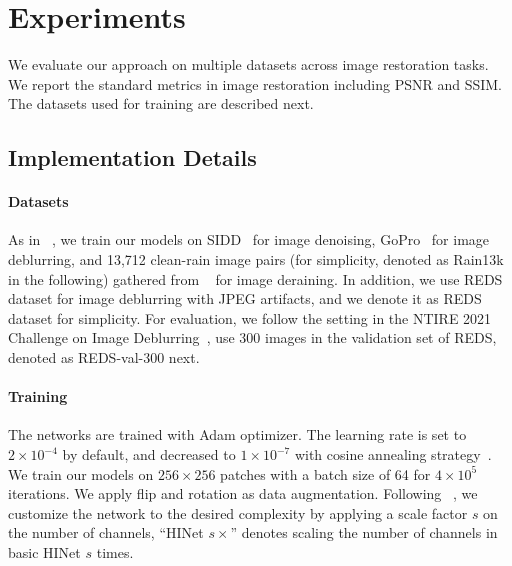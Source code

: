 \documentclass[final]{cvpr}
\begin{document}
\section{Experiments}
We evaluate our approach on multiple datasets across image restoration tasks. We report the standard metrics in image restoration including PSNR and SSIM. The datasets used for training are described next.
\subsection{Implementation Details}
\paragraph{Datasets}
As in ~\cite{Zamir2021MPRNet}, we train our models on SIDD~\cite{abdelhamed2018high} for image denoising, GoPro~\cite{nah2017deep} for image deblurring, and 13,712 clean-rain image pairs (for simplicity, denoted as Rain13k in the following) gathered from ~\cite{fu2017removing,li2016rain,yang2017deep,zhang2018density,zhang2019image} for image deraining. In addition, we use REDS~\cite{nah2019ntire} dataset for image deblurring with JPEG artifacts, and we denote it as REDS dataset for simplicity. For evaluation, we follow the setting in the NTIRE 2021 Challenge on Image Deblurring~\cite{nah2021ntire}, \ie use 300 images in the validation set of REDS, denoted as REDS-val-300 next. 


\paragraph{Training}
The networks are trained with Adam optimizer. The learning rate is set to $2\times10^{-4}$ by default, and decreased to $1\times10^{-7}$ with cosine annealing strategy~\cite{loshchilov2016sgdr}. We train our models on $256\times256$ patches with a batch size of 64 for $4\times10^5$ iterations. We apply flip and rotation as data augmentation.
Following ~\cite{zhang2018shufflenet}, we customize the network to the desired complexity by applying a scale factor $s$ on the number of channels, \eg ``HINet $s\times$'' denotes scaling the number of channels in basic HINet $s$ times. 
\end{document}
